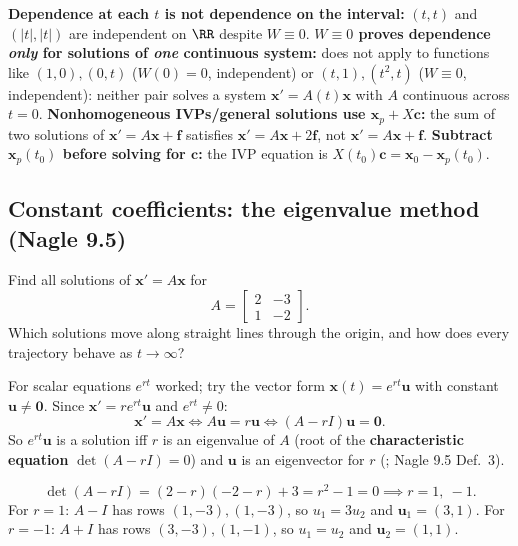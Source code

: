\documentclass[10pt]{scrartcl}
\newcommand{\vv}[1]{\mathbf{#1}}
\begin{document}
\begin{trapbox}
  \ii \textbf{Dependence at each $t$ is not dependence on the interval:} $(t,t)$ and $(|t|,|t|)$ are independent on $\RR$ despite $W\equiv 0$.
  \ii \textbf{$W\equiv 0$ proves dependence \emph{only} for solutions of \emph{one} continuous system:}  does not apply to functions like $(1,0),(0,t)$ ($W(0)=0$, independent) or $(t,1),(t^2,t)$ ($W\equiv 0$, independent): neither pair solves a system $\vv x'=A(t)\vv x$ with $A$ continuous across $t=0$.
  \ii \textbf{Nonhomogeneous IVPs/general solutions use $\vv x_p+X\vv c$:} the sum of two solutions of $\vv x'=A\vv x+\vv f$ satisfies $\vv x'=A\vv x+2\vv f$, not $\vv x'=A\vv x+\vv f$.
  \ii \textbf{Subtract $\vv x_p(t_0)$ before solving for $\vv c$:} the IVP equation is $X(t_0)\vv c=\vv x_0-\vv x_p(t_0)$.
\end{trapbox}

\subsection{Constant coefficients: the eigenvalue method (Nagle 9.5)}
\begin{qbox}
  Find all solutions of $\vv x'=A\vv x$ for
  \[
    A=\begin{bmatrix}2&-3\\1&-2\end{bmatrix}.
  \]
  Which solutions move along straight lines through the origin, and how does every trajectory behave as $t\to\infty$?
\end{qbox}

For scalar equations $e^{rt}$ worked; try the vector form $\vv x(t)=e^{rt}\vv u$ with constant $\vv u\neq\vv 0$. Since $\vv x'=re^{rt}\vv u$ and $e^{rt}\neq 0$:
\[
  \vv x'=A\vv x \iff A\vv u=r\vv u \iff (A-rI)\vv u=\vv 0.
\]
So $e^{rt}\vv u$ is a solution iff $r$ is an eigenvalue of $A$ (root of the \textbf{characteristic equation} $\det(A-rI)=0$) and $\vv u$ is an eigenvector for $r$ (; Nagle 9.5 Def.~3).

\begin{example*}
  \[
    \det(A-rI)=(2-r)(-2-r)+3=r^2-1=0\implies r=1,\ -1.
  \]
  For $r=1$: $A-I$ has rows $(1,-3),(1,-3)$, so $u_1=3u_2$ and $\vv u_1=(3,1)$. For $r=-1$: $A+I$ has rows $(3,-3),(1,-1)$, so $u_1=u_2$ and $\vv u_2=(1,1)$.
\end{example*}
\end{document}
